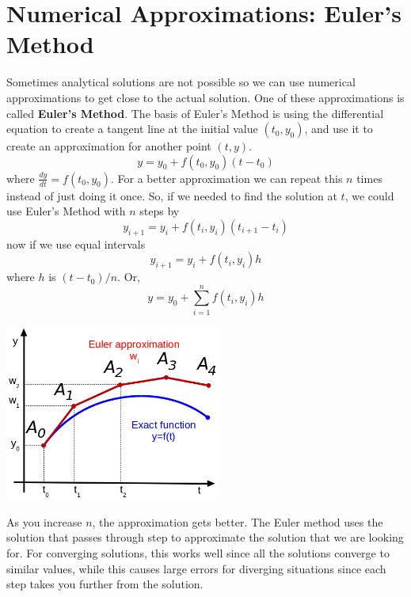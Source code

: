 \section{Numerical Approximations: Euler's Method}
    Sometimes analytical solutions are not possible so we can use numerical approximations to get close to the actual solution. One of these approximations is called \textbf{Euler's Method}. The basis of Euler's Method is using the differential equation to create a tangent line at the initial value $(t_0, y_0)$, and use it to create an approximation for another point $(t, y)$.
    \begin{equation*}
        y = y_0 + f(t_0, y_0)(t - t_0)
    \end{equation*}
    where $\frac{dy}{dt} = f(t_0, y_0)$. For a better approximation we can repeat this $n$ times instead of just doing it once. So, if we needed to find the solution at $t$, we could use Euler's Method with $n$ steps by
    \begin{equation*}
        y_{i+1} = y_i + f(t_i, y_i)(t_{i+1} - t_i)
    \end{equation*}
    now if we use equal intervals
    \begin{equation*}
        y_{i+1} = y_i + f(t_i, y_i)h
    \end{equation*}
    where $h$ is $(t - t_0) / n$. Or,
    \begin{equation*}
        y = y_0 + \sum_{i=1}^n f(t_i, y_i)h
    \end{equation*}
    \begin{center}
        \includegraphics[width=200pt]{euler.jpg}
    \end{center}
    As you increase $n$, the approximation gets better. The Euler method uses the solution that passes through step to approximate the solution that we are looking for. For converging solutions, this works well since all the solutions converge to similar values, while this causes large errors for diverging situations since each step takes you further from the solution.